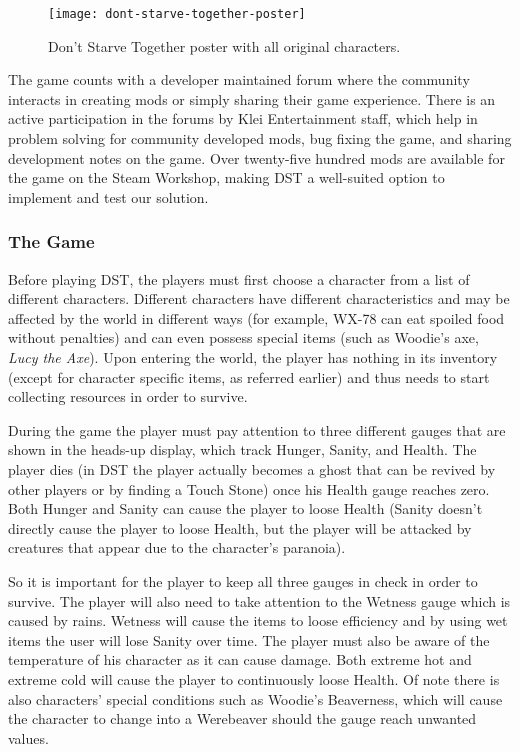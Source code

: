 \begin{figure}
  \centering
    \texttt{[image: dont-starve-together-poster]}
  \caption{Don't Starve Together poster with all original characters.}
  \label{fig:don't-starve-together-poster}
\end{figure}

The game counts with a developer maintained forum where the community interacts in creating mods or simply sharing their game experience.
There is an active participation in the forums by Klei Entertainment staff, which help in problem solving for community developed mods, bug fixing the game, and sharing development notes on the game.
Over twenty-five hundred mods are available for the game on the Steam Workshop, making \ac{DST} a well-suited option to implement and test our solution.

\subsubsection{The Game}
Before playing \ac{DST}, the players must first choose a character from a list of different characters.
Different characters have different characteristics and may be affected by the world in different ways (for example, WX-78 can eat spoiled food without penalties) and can even possess special items (such as Woodie's axe, \textit{Lucy the Axe}).
Upon entering the world, the player has nothing in its inventory (except for character specific items, as referred earlier) and thus needs to start collecting resources in order to survive.

During the game the player must pay attention to three different gauges that are shown in the heads-up display, which track Hunger, Sanity, and Health.
The player dies (in \ac{DST} the player actually becomes a ghost that can be revived by other players or by finding a Touch Stone) once his Health gauge reaches zero.
Both Hunger and Sanity can cause the player to loose Health (Sanity doesn't directly cause the player to loose Health, but the player will be attacked by creatures that appear due to the character's paranoia).

So it is important for the player to keep all three gauges in check in order to survive.
The player will also need to take attention to the Wetness gauge which is caused by rains. Wetness will cause the items to loose efficiency and by using wet items the user will lose Sanity over time.
The player must also be aware of the temperature of his character as it can cause damage. Both extreme hot and extreme cold will cause the player to continuously loose Health.
Of note there is also characters' special conditions such as Woodie's Beaverness, which will cause the character to change into a Werebeaver should the gauge reach unwanted values.

